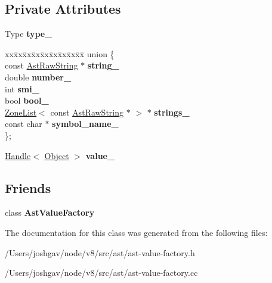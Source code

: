 \subsection*{Private Attributes}
\begin{DoxyCompactItemize}
\item 
Type {\bfseries type\+\_\+}\hypertarget{classv8_1_1internal_1_1_ast_value_a4a3f6f5b870ff4730290eaa384326ca6}{}\label{classv8_1_1internal_1_1_ast_value_a4a3f6f5b870ff4730290eaa384326ca6}

\item 
\begin{tabbing}
xx\=xx\=xx\=xx\=xx\=xx\=xx\=xx\=xx\=\kill
union \{\\
\>const \hyperlink{classv8_1_1internal_1_1_ast_raw_string}{AstRawString} $\ast$ {\bfseries string\_}\\
\>double {\bfseries number\_}\\
\>int {\bfseries smi\_}\\
\>bool {\bfseries bool\_}\\
\>\hyperlink{classv8_1_1internal_1_1_zone_list}{ZoneList}$<$ const \hyperlink{classv8_1_1internal_1_1_ast_raw_string}{AstRawString} $\ast$ $>$ $\ast$ {\bfseries strings\_}\\
\>const char $\ast$ {\bfseries symbol\_name\_}\\
\}; \hypertarget{classv8_1_1internal_1_1_ast_value_aa74c3df04bc563133415d0d041f2855b}{}\label{classv8_1_1internal_1_1_ast_value_aa74c3df04bc563133415d0d041f2855b}
\\

\end{tabbing}\item 
\hyperlink{classv8_1_1internal_1_1_handle}{Handle}$<$ \hyperlink{classv8_1_1internal_1_1_object}{Object} $>$ {\bfseries value\+\_\+}\hypertarget{classv8_1_1internal_1_1_ast_value_a8fc2969c3c3d81facd3fc23b2999a4ea}{}\label{classv8_1_1internal_1_1_ast_value_a8fc2969c3c3d81facd3fc23b2999a4ea}

\end{DoxyCompactItemize}
\subsection*{Friends}
\begin{DoxyCompactItemize}
\item 
class {\bfseries Ast\+Value\+Factory}\hypertarget{classv8_1_1internal_1_1_ast_value_a1d507e13f196677ce9bdd7b29efd96c0}{}\label{classv8_1_1internal_1_1_ast_value_a1d507e13f196677ce9bdd7b29efd96c0}

\end{DoxyCompactItemize}


The documentation for this class was generated from the following files\+:\begin{DoxyCompactItemize}
\item 
/\+Users/joshgav/node/v8/src/ast/ast-\/value-\/factory.\+h\item 
/\+Users/joshgav/node/v8/src/ast/ast-\/value-\/factory.\+cc\end{DoxyCompactItemize}
